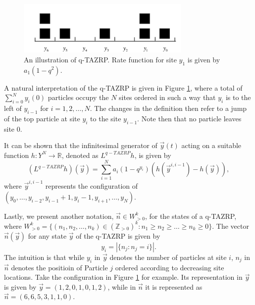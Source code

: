 \begin{figure}
	\centering
	\includegraphics[width=0.75\textwidth]{q-TAZRP}
	\caption[An illustration of q-TAZRP]
	{An illustration of q-TAZRP. Rate function for site $y_1$ is given by $a_1 (1-q^2)$.}
	\label{fig:qTAZRP}
\end{figure}

A natural interpretation of the q-TAZRP is given in Figure \ref{fig:qTAZRP}, where a total of $\sum_{i=0}^{N} y_i(0)$ particles occupy the $N$ sites ordered in such a way that $y_i$ is to the left of $y_{i-1}$ for $i = 1,2,\dots,N$. The changes in the definition then refer to a jump of the top particle at site $y_i$ to the site $y_{i-1}$. Note then that no particle leaves site $0$.

It can be shown that the infinitesimal generator of $\vec{y}(t)$ acting on a suitable function $h:Y^N \rightarrow \mathbb{R}$, denoted as $L^{q-TAZRP} h$, is given by $$(L^{q-TAZRP} h)(\vec{y}) = \sum_{i=1}^{N} a_i (1-q^{y_i}) (h(\vec{y}^{i,i-1}) - h(\vec{y})),$$ where $\vec{y}^{i,i-1}$ represents the configuration of $(y_0, \dots, y_{i-2}, y_{i-1}+1, y_i - 1, y_{i+1}, \dots, y_N)$.

Lastly, we present another notation, $\vec{n} \in W^k_{>0}$, for the states of a q-TAZRP, where $W^k_{>0} = \{(n_1,n_2,\dots,n_k) \in (\mathbb{Z}_{>0})^k : n_1 \ge n_2 \ge \dots \ge n_k \ge 0 \}$. The vector $\vec{n}(\vec{y})$ for any state $\vec{y}$ of the q-TAZRP is given by $$y_i = \left| \{ n_j : n_j = i \} \right|.$$ The intuition is that while $y_i$ in $\vec{y}$ denotes the number of particles at site $i$, $n_j$ in $\vec{n}$ denotes the positioin of Particle $j$ ordered according to decreasing site locations. Take the configuration in Figure \ref{fig:qTAZRP} for example. Its representation in $\vec{y}$ is given by $\vec{y} = (1,2,0,1,0,1,2)$, while in $\vec{n}$ it is represented as $\vec{n} = (6,6,5,3,1,1,0)$. 
